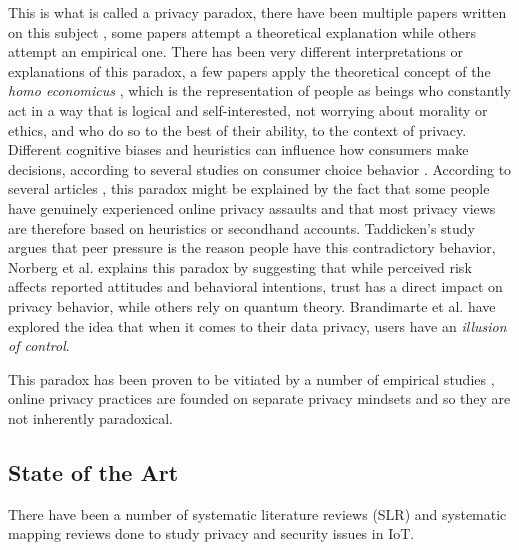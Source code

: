 \documentclass[conference]{IEEEtran}
\begin{document}
This is what is called a privacy paradox, there have been multiple papers
written on this subject \cite{solove2021myth, WilliamsPrivacy, lee2021investigating, goad2021privacy, gerber2018explaining},
some papers attempt a theoretical explanation while others attempt an empirical
one. There has been very different interpretations or explanations of this
paradox, a few papers \cite{wilson2012unpacking, warshaw2015can, lee2015privacy}
apply the theoretical concept of the \textit{homo economicus} \cite{zak2008moral},
which is the representation of people as beings who constantly act in a way
that is logical and self-interested, not worrying about morality or ethics,
and who do so to the best of their ability, to the context of privacy. Different
cognitive biases and heuristics can influence how consumers make decisions,
according to several studies on consumer choice behavior \cite{acquisti2007can, knijnenburg2013dimensionality, wakefield2013influence, flender2012type}.
According to several articles \cite{dienlin2015privacy, baek2014solving},
this paradox might be explained by the fact that some people have genuinely
experienced online privacy assaults and that most privacy views are therefore
based on heuristics or secondhand accounts. Taddicken's study \cite{taddicken2014privacy}
argues that peer pressure is the reason people have this contradictory behavior,
Norberg et al. \cite{norberg2007privacy} explains this paradox by suggesting
that while perceived risk affects reported attitudes and behavioral intentions,
trust has a direct impact on privacy behavior, while others \cite{flender2012type, kokolakis2017privacy}
rely on quantum theory. Brandimarte et al. \cite{brandimarte2013misplaced}
have explored the idea that when it comes to their data privacy, users have
an \textit{illusion of control}.

This paradox has been proven to be vitiated by a number of empirical studies \cite{dienlin2015privacy, xie2019consumers, SCHWAIG20131, sannon2018privacy},
online privacy practices are founded on separate privacy mindsets and so
they are not inherently paradoxical.

\subsection{State of the Art}

There have been a number of systematic literature reviews (SLR) \cite{Gupta2022Privacy, Kuhtreiber2022survey, sicari2015security, LinSurvey}
and systematic mapping reviews \cite{porras2018security, ahmed2019aspects}
done to study privacy and security issues in IoT.
\end{document}

